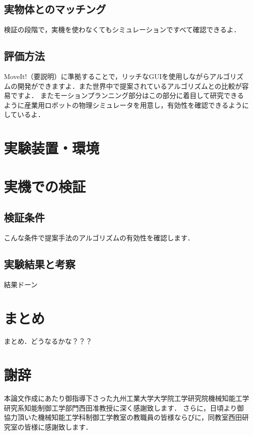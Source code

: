 \documentclass[a4paper,12pt]{jarticle}
\begin{document}
\subsection{実物体とのマッチング}
\label{sec:実物体とのマッチング}
検証の段階で，実機を使わなくてもシミュレーションですべて確認できるよ．

\subsection{評価方法}
\label{sec:モーションプランニングについて}
MoveIt!（要説明）に準拠することで，リッチなGUIを使用しながらアルゴリズムの開発ができますよ．また世界中で提案されているアルゴリズムとの比較が容易ですよ．
またモーションプランニング部分はこの部分に着目して研究できるように産業用ロボットの物理シミュレータを用意し，有効性を確認できるようにしているよ．


\section{実験装置・環境}
\label{sec:実験装置・環境}


\section{実機での検証}
\label{sec:実機での検証}
\subsection{検証条件}
\label{sec:検証条件}
こんな条件で提案手法のアルゴリズムの有効性を確認します．

\subsection{実験結果と考察}
\label{sec:実験結果と考察}
結果ドーン


\section{まとめ}
\label{sec:まとめ}
まとめ．どうなるかな？？？

\section*{謝辞}
本論文作成にあたり御指導下さった九州工業大学大学院工学研究院機械知能工学研究系知能制御工学部門西田准教授に深く感謝致します．
さらに，日頃より御協力頂いた機械知能工学科制御工学教室の教職員の皆様ならびに，同教室西田研究室の皆様に感謝致します．
\end{document}

